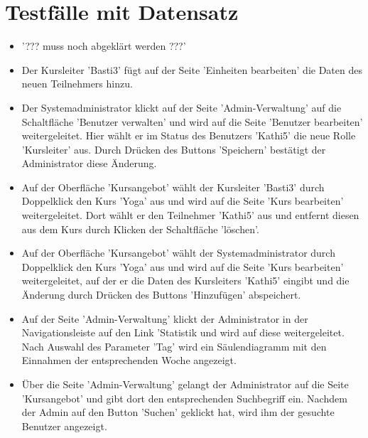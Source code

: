 \documentclass[a4paper]{scrreprt}
\newcounter{Lc}
\newcounter{Hc}
\newcommand{\stepHc}{\stepcounter{Hc}\setcounter{Lc}{0}}
\begin{document}
\section{Testfälle mit Datensatz}
			\stepHc
			\begin{itemize}
				\item {}
				'??? muss noch abgeklärt werden ???'
				
				\item {}
				Der Kursleiter 'Basti3' fügt auf der Seite 'Einheiten bearbeiten' die Daten des neuen Teilnehmers hinzu.
						
				\item {} 
				Der Systemadministrator klickt auf der Seite 'Admin-Verwaltung' auf die Schaltfläche 'Benutzer verwalten' und wird auf die Seite 'Benutzer bearbeiten' weitergeleitet. Hier wählt er im Status des Benutzers 'Kathi5' die neue Rolle 'Kursleiter' aus. Durch Drücken des Buttons 'Speichern' bestätigt der Administrator diese Änderung.
				
				\item {}
				Auf der Oberfläche 'Kursangebot' wählt der Kursleiter 'Basti3' durch Doppelklick den Kurs 'Yoga' aus und wird auf die Seite 'Kurs bearbeiten' weitergeleitet. Dort wählt er den Teilnehmer 'Kathi5' aus und entfernt diesen aus dem Kurs durch Klicken der Schaltfläche 'löschen'.
				
				\item {}
				Auf der Oberfläche 'Kursangebot' wählt der Systemadministrator durch Doppelklick den Kurs 'Yoga' aus und wird auf die Seite 'Kurs bearbeiten' weitergeleitet, auf der er die Daten des Kursleiters 'Kathi5' eingibt und die Änderung durch Drücken des Buttons 'Hinzufügen' abspeichert. 
				
				\item {}
				Auf der Seite 'Admin-Verwaltung' klickt der Administrator in der Navigationsleiste auf den Link 'Statistik und wird auf diese weitergeleitet. Nach Auswahl des Parameter 'Tag' wird ein Säulendiagramm mit den Einnahmen der entsprechenden Woche angezeigt. 
				
				\item {}
				Über die Seite 'Admin-Verwaltung' gelangt der Administrator auf die Seite 'Kursangebot' und gibt dort den entsprechenden Suchbegriff ein. Nachdem der Admin auf den Button 'Suchen' geklickt hat, wird ihm der gesuchte Benutzer angezeigt.
				

\end{itemize}
\end{document}
